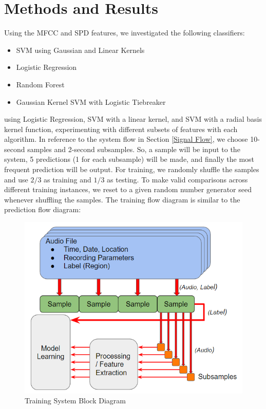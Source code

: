 \documentclass[journal]{IEEEtran}
\begin{document}
\section{Methods and Results}
Using the MFCC and SPD features, we investigated the following classifiers:
\begin{itemize}
\item SVM using Gaussian and Linear Kernels
\item Logistic Regression
\item Random Forest
\item Gaussian Kernel SVM with Logistic Tiebreaker
\end{itemize} using  Logistic Regression, SVM with a linear kernel, and SVM with a radial basis kernel function, experimenting with different subsets of features with each algorithm. In reference to the system flow in Section \ref{Signal Flow}, we choose 10-second samples and 2-second subsamples. So, a sample will be input to the system, 5 predictions (1 for each subsample) will be made, and finally the most frequent prediction will be output.  For training, we randomly shuffle the samples and use $2/3$ as training and $1/3$ as testing. To make valid comparisons across different training instances, we reset to a given random number generator seed whenever shuffling the samples. The training flow diagram is similar to the prediction flow diagram:
\begin{figure}[H]
\centering
\includegraphics[width=0.9\linewidth]{train_flow}
\caption{Training System Block Diagram}
\label{fig:training_bd}
\end{figure}
\end{document}
